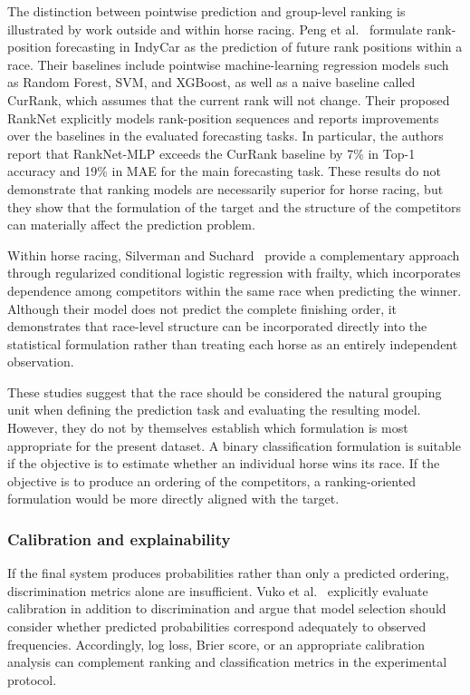 The distinction between pointwise prediction and group-level ranking is illustrated
by work outside and within horse racing. Peng et al.~\cite{ejeB_peng2020} formulate
rank-position forecasting in IndyCar as the prediction of future rank positions
within a race. Their baselines include pointwise machine-learning regression
models such as Random Forest, SVM, and XGBoost, as well as a naive baseline
called CurRank, which assumes that the current rank will not change. Their proposed
RankNet explicitly models rank-position sequences and reports improvements over the
baselines in the evaluated forecasting tasks. In particular, the authors report
that RankNet-MLP exceeds the CurRank baseline by 7\% in Top-1 accuracy and 19\% in
MAE for the main forecasting task. These results do not demonstrate that ranking
models are necessarily superior for horse racing, but they show that the formulation
of the target and the structure of the competitors can materially affect the
prediction problem.

Within horse racing, Silverman and Suchard~\cite{ejeA_gupta2023} provide a
complementary approach through regularized conditional logistic regression with
frailty, which incorporates dependence among competitors within the same race when
predicting the winner. Although their model does not predict the complete finishing
order, it demonstrates that race-level structure can be incorporated directly into
the statistical formulation rather than treating each horse as an entirely
independent observation.

These studies suggest that the race should be considered the natural grouping unit
when defining the prediction task and evaluating the resulting model. However, they
do not by themselves establish which formulation is most appropriate for the
present dataset. A binary classification formulation is suitable if the objective
is to estimate whether an individual horse wins its race. If the objective is to
produce an ordering of the competitors, a ranking-oriented formulation would be
more directly aligned with the target.

\subsubsection*{\textbf{Calibration and explainability}} If the final system produces probabilities
rather than only a predicted ordering, discrimination metrics alone are
insufficient. Vuko et al.~\cite{ejeB_vuko2025} explicitly evaluate calibration in
addition to discrimination and argue that model selection should consider whether
predicted probabilities correspond adequately to observed frequencies. Accordingly,
log loss, Brier score, or an appropriate calibration analysis can complement
ranking and classification metrics in the experimental protocol.

